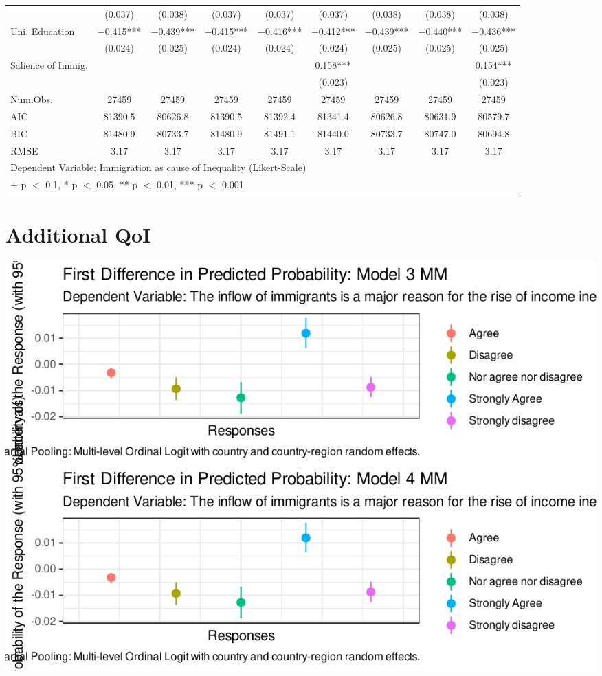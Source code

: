 \documentclass[
  11pt,
]{article}
\begin{document}
\begin{table}[H]
{\begin{tabular}[t]{lcccccccc}
 & (\num{0.037}) & (\num{0.038}) & (\num{0.037}) & (\num{0.037}) & (\num{0.037}) & (\num{0.038}) & (\num{0.038}) & (\num{0.038})\\
Uni. Education & \num{-0.415}*** & \num{-0.439}*** & \num{-0.415}*** & \num{-0.416}*** & \num{-0.412}*** & \num{-0.439}*** & \num{-0.440}*** & \num{-0.436}***\\
 & (\num{0.024}) & (\num{0.025}) & (\num{0.024}) & (\num{0.024}) & (\num{0.024}) & (\num{0.025}) & (\num{0.025}) & (\num{0.025})\\
Salience of Immig. &  &  &  &  & \num{0.158}*** &  &  & \num{0.154}***\\
 &  &  &  &  & (\num{0.023}) &  &  & (\num{0.023})\\
\midrule
Num.Obs. & \num{27459} & \num{27459} & \num{27459} & \num{27459} & \num{27459} & \num{27459} & \num{27459} & \num{27459}\\
AIC & \num{81390.5} & \num{80626.8} & \num{81390.5} & \num{81392.4} & \num{81341.4} & \num{80626.8} & \num{80631.9} & \num{80579.7}\\
BIC & \num{81480.9} & \num{80733.7} & \num{81480.9} & \num{81491.1} & \num{81440.0} & \num{80733.7} & \num{80747.0} & \num{80694.8}\\
RMSE & \num{3.17} & \num{3.17} & \num{3.17} & \num{3.17} & \num{3.17} & \num{3.17} & \num{3.17} & \num{3.17}\\
\bottomrule
\multicolumn{9}{l}{\rule{0pt}{1em}Dependent Variable: Immigration as cause of Inequality (Likert-Scale)}\\
\multicolumn{9}{l}{\rule{0pt}{1em}+ p $<$ 0.1, * p $<$ 0.05, ** p $<$ 0.01, *** p $<$ 0.001}\\
\end{tabular}}
\end{table}

\hypertarget{additional-qoi}{%
\section{Additional QoI}\label{additional-qoi}}

\includegraphics{AQM-paper_files/figure-latex/unnamed-chunk-1-1.pdf}
\end{document}
